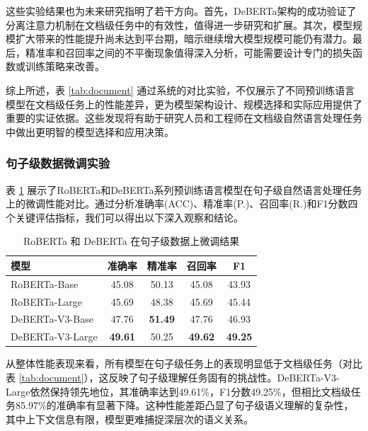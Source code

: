 这些实验结果也为未来研究指明了若干方向。首先，DeBERTa架构的成功验证了分离注意力机制在文档级任务中的有效性，值得进一步研究和扩展。其次，模型规模扩大带来的性能提升尚未达到平台期，暗示继续增大模型规模可能仍有潜力。最后，精准率和召回率之间的不平衡现象值得深入分析，可能需要设计专门的损失函数或训练策略来改善。

综上所述，表 \ref{tab:document} 通过系统的对比实验，不仅展示了不同预训练语言模型在文档级任务上的性能差异，更为模型架构设计、规模选择和实际应用提供了重要的实证依据。这些发现将有助于研究人员和工程师在文档级自然语言处理任务中做出更明智的模型选择和应用决策。

\subsubsection{句子级数据微调实验}

表 \ref{tab:sentence} 展示了RoBERTa和DeBERTa系列预训练语言模型在句子级自然语言处理任务上的微调性能对比。通过分析准确率(ACC)、精准率(P.)、召回率(R.)和F1分数四个关键评估指标，我们可以得出以下深入观察和结论。

\begin{table}[htbp]
\caption{RoBERTa 和 DeBERTa 在句子级数据上微调结果}
\centering
\begin{tabular}{l|cccc}
\toprule
\textbf{模型}& \textbf{准确率}   & \textbf{精准率}    & \textbf{召回率}    & \textbf{F1}   \\ \midrule
RoBERTa-Base \cite{liu_roberta_2019}     & 45.08          & 50.13          & 45.08          & 43.93          \\
RoBERTa-Large \cite{liu_roberta_2019}    & 45.69          & 48.38          & 45.69          & 45.44          \\
DeBERTa-V3-Base \cite{he2023debertav3improvingdebertausing} & 47.76          & \textbf{51.49} & 47.76          & 46.93          \\
DeBERTa-V3-Large \cite{he2023debertav3improvingdebertausing} & \textbf{49.61} & 50.25          & \textbf{49.62} & \textbf{49.25} \\ \bottomrule
\end{tabular}
\label{tab:sentence}
\end{table}

从整体性能表现来看，所有模型在句子级任务上的表现明显低于文档级任务（对比表 \ref{tab:document}），这反映了句子级理解任务固有的挑战性。DeBERTa-V3-Large依然保持领先地位，其准确率达到49.61\%，F1分数49.25\%，但相比文档级任务85.97\%的准确率有显著下降。这种性能差距凸显了句子级语义理解的复杂性，其中上下文信息有限，模型更难捕捉深层次的语义关系。


